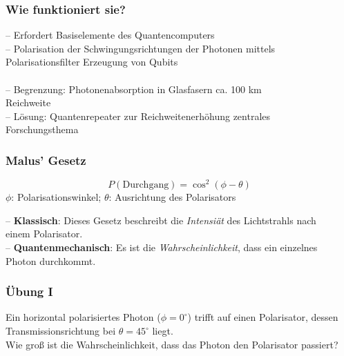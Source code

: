 \begin{frame}
	\frametitle{Wie funktioniert sie?}
	-- Erfordert Basiselemente des Quantencomputers\\
	-- Polarisation der Schwingungsrichtungen der Photonen mittels\\
		\hspace{0.5em} Polarisationsfilter \textrightarrow { }Erzeugung von Qubits\\
	\vspace{-2.5em}
	\hspace{9em}\\
	\vspace{-2.0em}
	-- Begrenzung: Photonenabsorption in Glasfasern \textrightarrow { }ca. 100 km\\
		\hspace{0.5em} Reichweite\\
	-- L{\"o}sung: Quantenrepeater zur Reichweitenerhöhung \textrightarrow { }zentrales\\
	\hspace{0.5em} Forschungsthema
\end{frame}

\begin{frame}
	\frametitle{Malus’ Gesetz}
	\begin{Definition}
		\[\mathit{P}(\text{Durchgang}) = \cos^2(\phi - \theta)\]
		$\phi$: Polarisationswinkel; $\theta$: Ausrichtung des Polarisators 
	\end{Definition}
	-- \textbf{Klassisch}: Dieses Gesetz beschreibt die \textit{Intensi{\"a}t} des Lichtstrahls nach\\
		\hspace{0.5em} einem Polarisator.\\
	-- \textbf{Quantenmechanisch}: Es ist die \textit{Wahrscheinlichkeit}, dass ein einzelnes\\
		\hspace{0.5em} Photon durchkommt.
\end{frame}

\begin{frame}
	\frametitle{{\"U}bung I}
	Ein horizontal polarisiertes Photon ($\phi = 0^\circ$) trifft auf einen Polarisator, 
	dessen Transmissionsrichtung bei $\theta = 45^\circ$ liegt.\\
	Wie groß ist die Wahrscheinlichkeit, dass das Photon den Polarisator passiert?
\end{frame}

